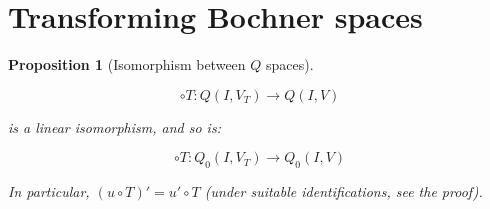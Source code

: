 \documentclass[english,a4paper,12pt,oneside]{scrbook}
\theoremstyle{break}
\newtheorem{prop}[equation]{Proposition}
\theoremstyle{remark}
\newcommand{\norm}[1]{\left\lVert#1\right\rVert}
\newcommand{\tr}{\text{tr}}
\newcommand{\tred}[1]{\textcolor{red}{#1}}
\begin{document}
%
%
%
%
%
%
%
%
%
%		
%

\section{Transforming Bochner spaces}

\begin{prop}[Isomorphism between $Q$ spaces]
\label{prop:change_boch}

$$\circ T : Q(I,V_T)\rightarrow Q(I,V)$$

is a linear isomorphism, and so is:

$$\circ T : Q_0(I,V_T)\rightarrow Q_0(I,V)$$

In particular, $(u\circ T)' = u'\circ T$ (under suitable identifications, see the proof).

\end{prop}
\end{document}

